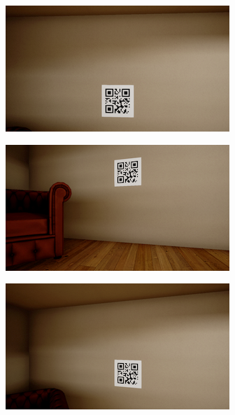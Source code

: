 \begin{figure}[H]
\begin{subfigure}{0.32\textwidth}
        \vspace{0.5em}
    \end{subfigure}
    \hfill
    \begin{subfigure}{0.32\textwidth}
        \centering
        \includegraphics[width=\textwidth]{resources/png/06/markers/qr/2.png}
        \vspace{0.5em}
    \end{subfigure}
    \begin{subfigure}{0.32\textwidth}
        \centering
        \includegraphics[width=\textwidth]{resources/png/06/markers/qr/3.png}
    \end{subfigure}
    \hfill
    \begin{subfigure}{0.32\textwidth}
        \centering
        \includegraphics[width=\textwidth]{resources/png/06/markers/qr/4.png}

\end{subfigure}
\end{figure}
